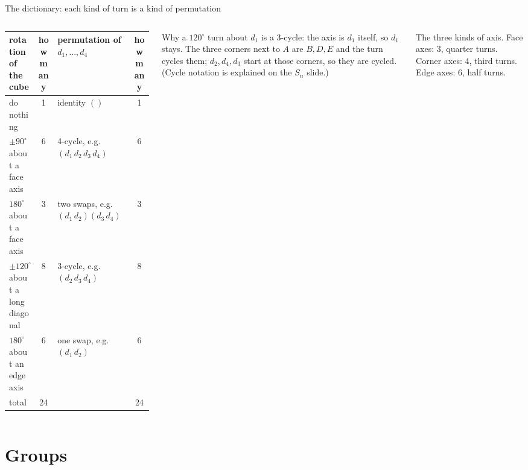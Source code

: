 \documentclass[aspectratio=169,10pt]{beamer}
\begin{document}
\begin{frame}{The dictionary: each kind of turn is a kind of permutation}
\begin{columns}[T]
\scriptsize
\begin{tabular}{@{}p{2.9cm}cp{3.2cm}c@{}}
\toprule
rotation of the cube & how many & permutation of $d_1,\dots,d_4$ & how many\\
\midrule
do nothing & 1 & identity $()$ & 1\\
$\pm90^\circ$ about a face axis & 6 & 4-cycle, e.g.\ $(d_1\,d_2\,d_3\,d_4)$ & 6\\
$180^\circ$ about a face axis & 3 & two swaps, e.g.\ $(d_1\,d_2)(d_3\,d_4)$ & 3\\
$\pm120^\circ$ about a long diagonal & 8 & 3-cycle, e.g.\ $(d_2\,d_3\,d_4)$ & 8\\
$180^\circ$ about an edge axis & 6 & one swap, e.g.\ $(d_1\,d_2)$ & 6\\
\midrule
total & 24 & & 24\\
\bottomrule
\end{tabular}
\vspace{6pt}
\begin{whybox}
Why a $120^\circ$ turn about $d_1$ is a 3-cycle: the axis is $d_1$ itself, so $d_1$ stays. The three corners next to $A$ are $B,D,E$ and the turn cycles them; $d_2,d_4,d_3$ start at those corners, so they are cycled. (Cycle notation is explained on the $S_n$ slide.)
\end{whybox}
\centering\scalebox{0.48}{\figaxes}\par
{\scriptsize The three kinds of axis. Face axes: 3, quarter turns. Corner axes: 4, third turns. Edge axes: 6, half turns.}
\end{columns}
\end{frame}

\section{Groups}
\end{document}
